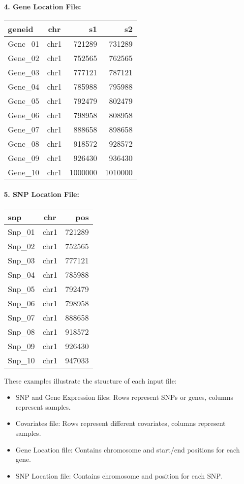 \documentclass[12pt,a4paper]{article}
\begin{document}
\paragraph{4. Gene Location File:}
\small
\begin{longtable}{l|c|r|r}
\hline
geneid & chr & s1 & s2 \\
\hline
Gene\_01 & chr1 & 721289 & 731289 \\
Gene\_02 & chr1 & 752565 & 762565 \\
Gene\_03 & chr1 & 777121 & 787121 \\
Gene\_04 & chr1 & 785988 & 795988 \\
Gene\_05 & chr1 & 792479 & 802479 \\
Gene\_06 & chr1 & 798958 & 808958 \\
Gene\_07 & chr1 & 888658 & 898658 \\
Gene\_08 & chr1 & 918572 & 928572 \\
Gene\_09 & chr1 & 926430 & 936430 \\
Gene\_10 & chr1 & 1000000 & 1010000 \\
\hline
\end{longtable}
\normalsize

\paragraph{5. SNP Location File:}
\small
\begin{longtable}{l|c|r}
\hline
snp & chr & pos \\
\hline
Snp\_01 & chr1 & 721289 \\
Snp\_02 & chr1 & 752565 \\
Snp\_03 & chr1 & 777121 \\
Snp\_04 & chr1 & 785988 \\
Snp\_05 & chr1 & 792479 \\
Snp\_06 & chr1 & 798958 \\
Snp\_07 & chr1 & 888658 \\
Snp\_08 & chr1 & 918572 \\
Snp\_09 & chr1 & 926430 \\
Snp\_10 & chr1 & 947033 \\
\hline
\end{longtable}
\normalsize

These examples illustrate the structure of each input file:

\begin{itemize}
    \item SNP and Gene Expression files: Rows represent SNPs or genes, columns represent samples.
    \item Covariates file: Rows represent different covariates, columns represent samples.
    \item Gene Location file: Contains chromosome and start/end positions for each gene.
    \item SNP Location file: Contains chromosome and position for each SNP.
\end{itemize}
\end{document}
